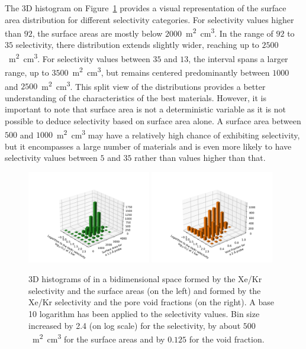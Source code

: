 \documentclass[main.tex]{subfiles}
\begin{document}
The 3D histogram on Figure~\ref{fgr:3D_hist_sa_vol} provides a visual representation of the surface area distribution for different selectivity categories. For selectivity values higher than $92$, the surface areas are mostly below $2000$~\si{\square\meter\cubic\centi\meter}. In the range of $92$ to $35$ selectivity, there distribution extends slightly wider, reaching up to $2500$~\si{\square\meter\cubic\centi\meter}. For selectivity values between $35$ and $13$, the interval spans a larger range, up to $3500$~\si{\square\meter\cubic\centi\meter}, but remains centered predominantly between $1000$ and $2500$~\si{\square\meter\cubic\centi\meter}. This split view of the distributions provides a better understanding of the characteristics of the best materials. However, it is important to note that surface area is not a deterministic variable as it is not possible to deduce selectivity based on surface area alone. A surface area between $500$ and $1000$~\si{\square\meter\cubic\centi\meter} may have a relatively high chance of exhibiting selectivity, but it encompasses a large number of materials and is even more likely to have selectivity values between $5$ and $35$ rather than values higher than that. 
\begin{figure}[ht!]
  \centering
  \includegraphics[width=0.48\textwidth,trim={2cm 0 2cm 2cm},clip]{figures/2-thermo/3D_hist_selec_SA.pdf}
  \includegraphics[width=0.48\textwidth,trim={2cm 0 2cm 2cm},clip]{figures/2-thermo/3D_hist_selec_vol.pdf}
  \caption{3D histograms of in a bidimensional space formed by the Xe/Kr selectivity and the surface areas (on the left) and formed by the Xe/Kr selectivity and the pore void fractions (on the right). A base 10 logarithm has been applied to the selectivity values. Bin size increased by 2.4 (on log scale) for the selectivity, by about $500$~\si{\square\meter\cubic\centi\meter} for the surface areas and by $0.125$ for the void fraction. }\label{fgr:3D_hist_sa_vol}
\end{figure}
\end{document}

